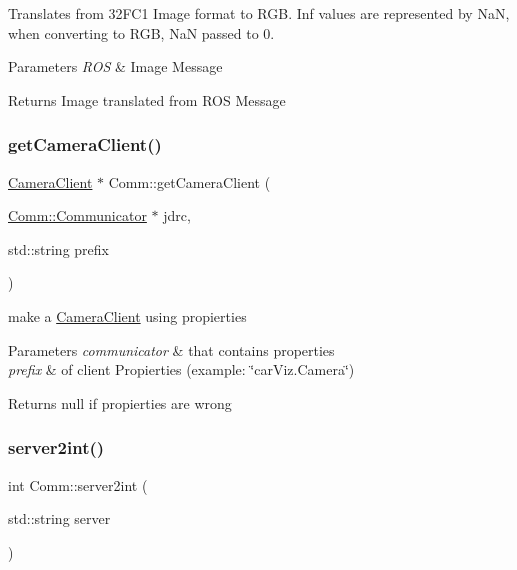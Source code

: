 Translates from 32\+F\+C1 Image format to R\+GB. Inf values are represented by NaN, when converting to R\+GB, NaN passed to 0. 


\begin{DoxyParams}{Parameters}
{\em R\+OS} & Image Message\\
\hline
\end{DoxyParams}
\begin{DoxyReturn}{Returns}
Image translated from R\+OS Message 
\end{DoxyReturn}
\mbox{\label{namespace_comm_a488b3721b4d9a501e8cd38388ab30437}} 
\subsubsection{\texorpdfstring{get\+Camera\+Client()}{getCameraClient()}}
{\footnotesize\ttfamily \hyperlink{class_comm_1_1_camera_client}{Camera\+Client} $\ast$ Comm\+::get\+Camera\+Client (\begin{DoxyParamCaption}\item[{\hyperlink{class_comm_1_1_communicator}{Comm\+::\+Communicator} $\ast$}]{jdrc,  }\item[{std\+::string}]{prefix }\end{DoxyParamCaption})}



make a \hyperlink{class_comm_1_1_camera_client}{Camera\+Client} using propierties 


\begin{DoxyParams}{Parameters}
{\em communicator} & that contains properties \\
\hline
{\em prefix} & of client Propierties (example\+: \char`\"{}car\+Viz.\+Camera\char`\"{})\\
\hline
\end{DoxyParams}
\begin{DoxyReturn}{Returns}
null if propierties are wrong 
\end{DoxyReturn}
\mbox{\label{namespace_comm_ab6b021c81a3c5ebabd75caaffa9f16da}} 
\subsubsection{\texorpdfstring{server2int()}{server2int()}}
{\footnotesize\ttfamily int Comm\+::server2int (\begin{DoxyParamCaption}\item[{std\+::string}]{server }\end{DoxyParamCaption})}

